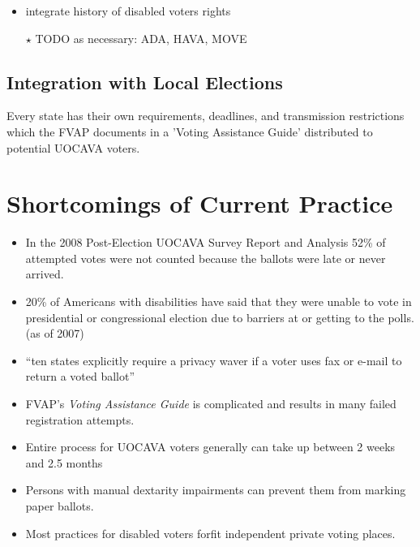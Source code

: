 










\begin{itemize}
\item integrate history of disabled voters rights
\item[$\star$] TODO as necessary: ADA, HAVA, MOVE
\end{itemize}

\subsection{Integration with Local Elections}

Every state has their own requirements, deadlines, and transmission restrictions which the FVAP documents in a 'Voting Assistance Guide' distributed to potential UOCAVA voters. 

\section{Shortcomings of Current Practice}

\begin{itemize}
\item In the 2008 Post-Election UOCAVA Survey Report and Analysis 52\% of attempted votes were not counted because the ballots were late or never arrived.
\item 20\% of Americans with disabilities have said that they were unable to vote in presidential or congressional election due to barriers at or getting to the polls. (as of 2007)
\item ``ten states explicitly require a privacy waver if a voter uses fax or e-mail to return a voted ballot''
\item FVAP's {\em Voting Assistance Guide} is complicated and results in many failed registration attempts.
\item Entire process for UOCAVA voters generally can take up between 2 weeks and 2.5 months
\item Persons with manual dextarity impairments can prevent them from marking paper ballots.
\item Most practices for disabled voters forfit independent private voting places.
\end{itemize}

